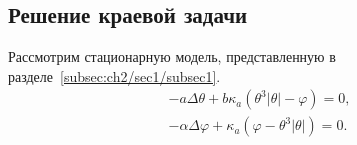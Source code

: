 %
%
%
%
%
%


\subsection{Решение краевой задачи}
\label{subsec:ch4/sec1/boundary}

Рассмотрим стационарную модель,
представленную в разделе~\ref{subsec:ch2/sec1/subsec1}.
\begin{equation*}
    \begin{aligned}
        - a \Delta \theta + b \kappa_a(\theta ^ 3 | \theta | - \varphi) = 0,  \\
        - \alpha \Delta \varphi + \kappa_a (\varphi - \theta ^3 | \theta |) = 0.
    \end{aligned}
\end{equation*}

